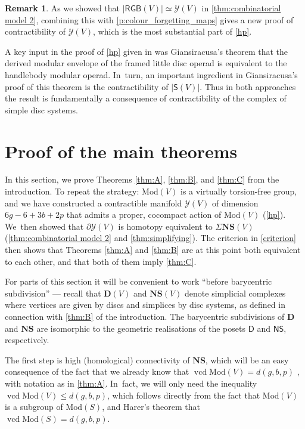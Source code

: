 \documentclass[11pt]{article}
\theoremstyle{plain}
\theoremstyle{definition}
\newtheorem{rem}[thm]{Remark}
\newcommand{\Y}{\mathcal Y}
\newcommand{\RGB}{{\mathsf{RGB}}}
\newcommand{\compNS}{\mathbf{NS}}
\newcommand{\compD}{\mathbf{D}}
\newcommand{\SD}{\mathsf{S}}
\newcommand{\mcg}{\mathrm{Mod}}
\newcommand{\hmod}{\mathrm{Mod}}
\begin{document}
\begin{rem} \label{rem:alternative_contractibility_proof} As we showed that $|\RGB(V)| \simeq \Y(V)$ in \cref{thm:combinatorial model 2}, combining this with \cref{p:colour_forgetting_maps} gives a new proof of contractibility of $\Y(V)$, which is the most substantial part of \cref{hp}.

A key input in the proof of \cref{hp} given in \cite{hainautpetersen} was Giansiracusa's theorem \cite{giansiracusa} that the derived modular envelope of the framed little disc operad is equivalent to the handlebody modular operad. In~turn, an important ingredient in Giansiracusa's proof of this theorem is the contractibility of $|\SD(V)|$. Thus in both approaches the result is fundamentally a consequence of contractibility of the complex of simple disc systems. \end{rem}

\section{Proof of the main theorems}

In this section, we prove Theorems \ref{thm:A}, \ref{thm:B}, and \ref{thm:C} from the introduction. To repeat the strategy: $\hmod(V)$ is a virtually torsion-free group, and we have constructed a contractible manifold $\mathcal{Y}(V)$ of dimension $6g-6+3b+2p$ that admits a proper, cocompact action of $\hmod(V)$ (\cref{hp}). We~then showed that $\partial \mathcal{Y}(V)$ is homotopy equivalent to $\Sigma \compNS(V)$ (\cref{thm:combinatorial model 2} and \cref{thm:simplifying}). The criterion in \cref{criterion} then shows that Theorems \ref{thm:A} and \ref{thm:B} are at this point both equivalent to each other, and that both of them imply \cref{thm:C}.

For parts of this section it will be convenient to work ``before barycentric subdivision'' --- recall that $\compD(V)$ and $\compNS(V)$ denote simplicial complexes where vertices are given by discs and simplices by disc systems, as defined in connection with \cref{thm:B} of the introduction. The barycentric subdivisions of $\compD$ and $\compNS$ are isomorphic to the geometric realisations of the posets $\mathsf D$ and $\mathsf{NS}$, respectively.

The first step is high (homological) connectivity of $\compNS$, which will be an easy consequence of the fact that we already know that $\operatorname{vcd}\hmod(V) =d(g,b,p)$ \cite{hirose}, with notation as in \cref{thm:A}. In~fact, we will only need the inequality $\operatorname{vcd} \hmod(V)\leq d(g,b,p)$, which follows directly from the fact that $\hmod(V)$ is a subgroup of $\mcg(S)$, and Harer's theorem \cite{harer} that $\operatorname{vcd} \mcg(S)=d(g,b,p).$
\end{document}
